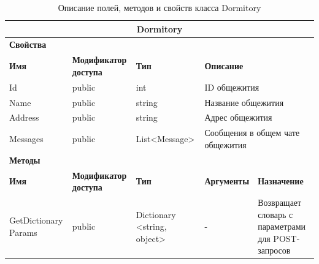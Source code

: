 \documentclass{../includes/TechDoc}
\begin{document}
    \begin{table}[ht]
        \caption{\label{tab:class-dormitory-table}Описание полей, методов и свойств класса Dormitory}
        \centering
        \begin{tabular}{|p{3cm}|p{3cm}|p{3cm}|p{2.6cm}|p{4cm}|}
            \hline
            \multicolumn{5}{|c|}{Dormitory} \\ \hline
            \multicolumn{5}{|l|}{\textbf{Свойства}} \\ \hline
            \textbf{Имя} & \textbf{Модификатор доступа} & \textbf{Тип} & \multicolumn{2}{l|}{\textbf{Описание}} \\ \hline
            Id & public & int & \multicolumn{2}{l|}{ID общежития} \\ \hline
            Name & public & string & \multicolumn{2}{l|}{Название общежития} \\ \hline
            Address & public & string & \multicolumn{2}{l|}{Адрес общежития} \\ \hline
            Messages & public & List<Message> & \multicolumn{2}{p{7cm}|}{Сообщения в общем чате общежития} \\ \hline
            \multicolumn{5}{|l|}{\textbf{Методы}} \\ \hline
            \textbf{Имя} & \textbf{Модификатор доступа} & \textbf{Тип} & \textbf{Аргументы} & \textbf{Назначение} \\ \hline
            GetDictionary Params & public & Dictionary <string, object> & - & Возвращает словарь с параметрами для POST-запросов \\ \hline
        \end{tabular}
    \end{table}

    \newpage
\end{document}
